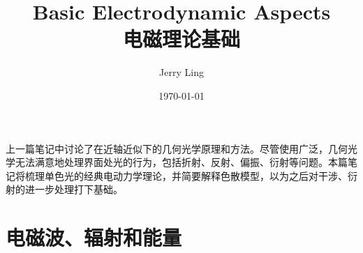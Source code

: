 \documentclass[12pt]{ctexart}%
\title{Basic Electrodynamic Aspects\\电磁理论基础}
\author{Jerry Ling}
\date{\today}
\begin{document}
\maketitle  %
上一篇笔记中讨论了在近轴近似下的几何光学原理和方法。尽管使用广泛，几何光学无法满意地处理界面处光的行为，包括折射、反射、偏振、衍射等问题。本篇笔记将梳理单色光的经典电动力学理论，并简要解释色散模型，以为之后对干涉、衍射的进一步处理打下基础。
\section*{电磁波、辐射和能量}
\end{document}
